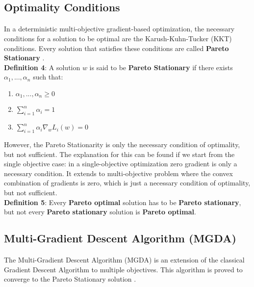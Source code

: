 \documentclass[letterpaper]{article}
\begin{document}
\subsection{Optimality Conditions}
\paragraph{}

In a deterministic multi-objective gradient-based optimization, the necessary conditions for a solution to be optimal are the Karush-Kuhn-Tucker (KKT) conditions. Every solution that satisfies these conditions are called \textbf{Pareto Stationary} \cite{desideri:hal-00768935}.\\
\newline
\textbf{Definition 4}: A solution $w$ is said to be \textbf{Pareto Stationary} if there exists $\alpha_1,...,\alpha_n$ such that:
\begin{enumerate}
    \item $\alpha_1,...,\alpha_n \geq 0$
    \item $\sum_{i=1}^{n} \alpha_{i}=1$
    \item $\sum_{i=1}^{n} \alpha_{i} \nabla_{w} L_{i}(w)=0$
\end{enumerate}
However, the Pareto Stationarity is only the necessary condition of optimality, but not sufficient. The explanation for this can be found if we start from the single objective case: in a single-objective optimization zero gradient is only a necessary condition. It extends to multi-objective problem where the convex combination of gradients is zero, which is just a necessary condition of optimality, but not sufficient.
\\
\newline
\textbf{Definition 5}: Every \textbf{Pareto optimal} solution has to be \textbf{Pareto stationary}, but not every \textbf{Pareto stationary} solution is \textbf{Pareto optimal}.

\subsection{Multi-Gradient Descent Algorithm (MGDA)}
\paragraph{}

The Multi-Gradient Descent Algorithm (MGDA) is an extension of the classical Gradient Descent Algorithm to multiple objectives. This algorithm is proved to converge to the Pareto Stationary solution \cite{desideri:hal-00768935}.
\end{document}
